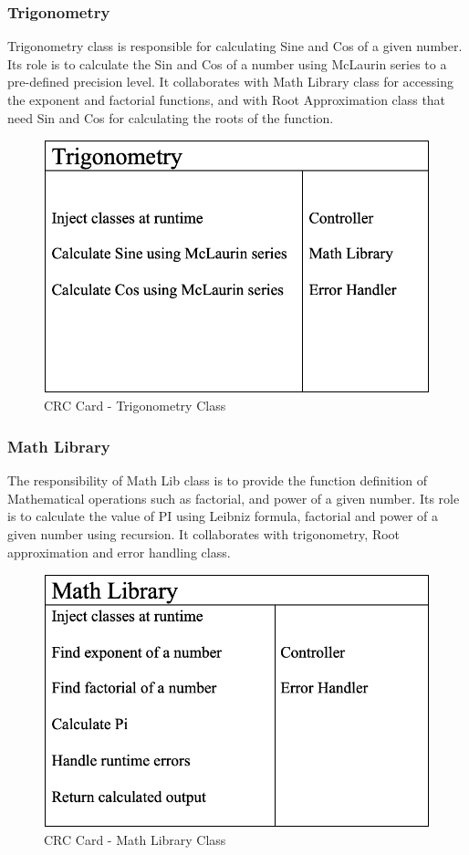     \subsubsection{Trigonometry}
    \parbox{1.0\linewidth}{
      Trigonometry class is responsible for calculating Sine and Cos of a given number. Its role is to calculate the Sin and Cos of a number using McLaurin series to a pre-defined precision level. It collaborates with Math Library class for accessing the exponent and factorial functions, and with Root Approximation class that need Sin and Cos for calculating the roots of the function.
    }
    \vspace*{2em}
    \begin{figure}[h!]
      \centering
      \includegraphics[width=.5\linewidth]{resources/Trigonometry.png}
      \caption{CRC Card - Trigonometry Class}\label{fig:trignometry}
    \end{figure} 

    \subsubsection{Math Library}
      \parbox{1.0\linewidth}{
        The responsibility of Math Lib class is to provide the function definition of Mathematical operations such as factorial, and power of a given number. Its role is to calculate the value of PI using Leibniz formula, factorial and power of a given number using recursion. It collaborates with trigonometry, Root approximation and error handling class.
      }
      \vspace*{2em}
      \begin{figure}[h!]
        \centering
        \includegraphics[width=.5\linewidth]{resources/MathLib.png}
        \caption{CRC Card - Math Library Class}\label{fig:mathlib}
      \end{figure}
      
